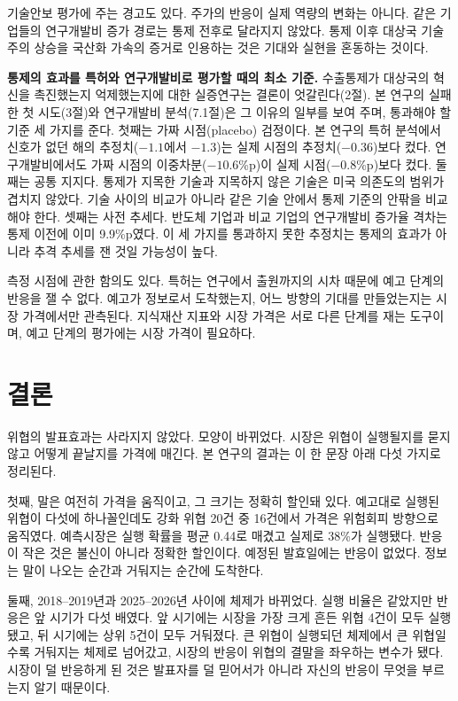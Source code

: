 \documentclass[11pt,a4paper]{article}
\newcommand{\pp}{\%p}
\begin{document}
기술안보 평가에 주는 경고도 있다. 주가의 반응이 실제 역량의 변화는 아니다. 같은 기업들의 연구개발비 증가 경로는 통제 전후로 달라지지 않았다. 통제 이후 대상국 기술주의 상승을 국산화 가속의 증거로 인용하는 것은 기대와 실현을 혼동하는 것이다.

\textbf{통제의 효과를 특허와 연구개발비로 평가할 때의 최소 기준.} 수출통제가 대상국의 혁신을 촉진했는지 억제했는지에 대한 실증연구는 결론이 엇갈린다(2절). 본 연구의 실패한 첫 시도(3절)와 연구개발비 분석(7.1절)은 그 이유의 일부를 보여 주며, 통과해야 할 기준 세 가지를 준다. 첫째는 가짜 시점(placebo) 검정이다. 본 연구의 특허 분석에서 신호가 없던 해의 추정치($-1.1$에서 $-1.3$)는 실제 시점의 추정치($-0.36$)보다 컸다. 연구개발비에서도 가짜 시점의 이중차분($-10.6$\pp{})이 실제 시점($-0.8$\pp{})보다 컸다. 둘째는 공통 지지다. 통제가 지목한 기술과 지목하지 않은 기술은 미국 의존도의 범위가 겹치지 않았다. 기술 사이의 비교가 아니라 같은 기술 안에서 통제 기준의 안팎을 비교해야 한다. 셋째는 사전 추세다. 반도체 기업과 비교 기업의 연구개발비 증가율 격차는 통제 이전에 이미 9.9\pp{}였다. 이 세 가지를 통과하지 못한 추정치는 통제의 효과가 아니라 추격 추세를 잰 것일 가능성이 높다.

측정 시점에 관한 함의도 있다. 특허는 연구에서 출원까지의 시차 때문에 예고 단계의 반응을 잴 수 없다. 예고가 정보로서 도착했는지, 어느 방향의 기대를 만들었는지는 시장 가격에서만 관측된다. 지식재산 지표와 시장 가격은 서로 다른 단계를 재는 도구이며, 예고 단계의 평가에는 시장 가격이 필요하다.

\section{결론}

위협의 발표효과는 사라지지 않았다. 모양이 바뀌었다. 시장은 위협이 실행될지를 묻지 않고 어떻게 끝날지를 가격에 매긴다. 본 연구의 결과는 이 한 문장 아래 다섯 가지로 정리된다.

첫째, 말은 여전히 가격을 움직이고, 그 크기는 정확히 할인돼 있다. 예고대로 실행된 위협이 다섯에 하나꼴인데도 강화 위협 20건 중 16건에서 가격은 위험회피 방향으로 움직였다. 예측시장은 실행 확률을 평균 0.44로 매겼고 실제로 38\%가 실행됐다. 반응이 작은 것은 불신이 아니라 정확한 할인이다. 예정된 발효일에는 반응이 없었다. 정보는 말이 나오는 순간과 거둬지는 순간에 도착한다.

둘째, 2018--2019년과 2025--2026년 사이에 체제가 바뀌었다. 실행 비율은 같았지만 반응은 앞 시기가 다섯 배였다. 앞 시기에는 시장을 가장 크게 흔든 위협 4건이 모두 실행됐고, 뒤 시기에는 상위 5건이 모두 거둬졌다. 큰 위협이 실행되던 체제에서 큰 위협일수록 거둬지는 체제로 넘어갔고, 시장의 반응이 위협의 결말을 좌우하는 변수가 됐다. 시장이 덜 반응하게 된 것은 발표자를 덜 믿어서가 아니라 자신의 반응이 무엇을 부르는지 알기 때문이다.
\end{document}
